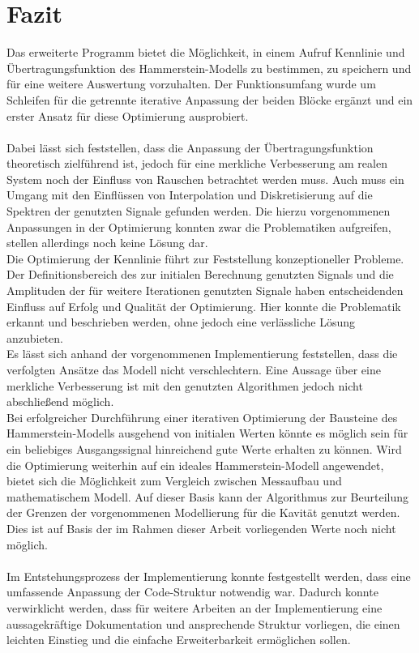 \documentclass[../Report.tex]{subfiles}
\begin{document}
\chapter{Fazit}
\label{chap:fazit}
Das erweiterte Programm bietet die Möglichkeit, in einem Aufruf Kennlinie und Übertragungsfunktion des Hammerstein-Modells zu bestimmen, zu speichern und für eine weitere Auswertung vorzuhalten.
Der Funktionsumfang wurde um Schleifen für die getrennte iterative Anpassung der beiden Blöcke ergänzt und ein erster Ansatz für diese Optimierung ausprobiert.
\\
\\ 
Dabei lässt sich feststellen, dass die Anpassung der Übertragungsfunktion theoretisch zielführend ist, jedoch für eine merkliche Verbesserung am realen System noch der Einfluss von Rauschen betrachtet werden muss. Auch muss ein Umgang mit den Einflüssen von Interpolation und Diskretisierung auf die Spektren der genutzten Signale gefunden werden. Die hierzu vorgenommenen Anpassungen in der Optimierung konnten zwar die Problematiken aufgreifen, stellen allerdings noch keine Lösung dar.
\\
Die Optimierung der Kennlinie führt zur Feststellung konzeptioneller Probleme. Der Definitionsbereich des zur initialen Berechnung genutzten Signals und die Amplituden der für weitere Iterationen genutzten Signale haben entscheidenden Einfluss auf Erfolg und Qualität der Optimierung. Hier konnte die Problematik erkannt und beschrieben werden, ohne jedoch eine verlässliche Lösung anzubieten. 
\\
Es lässt sich anhand der vorgenommenen Implementierung feststellen, dass die verfolgten Ansätze das Modell nicht verschlechtern. Eine Aussage über eine merkliche Verbesserung ist mit den genutzten Algorithmen jedoch nicht abschließend möglich. 
\\
Bei erfolgreicher Durchführung einer iterativen Optimierung der Bausteine des Hammerstein-Modells ausgehend von initialen Werten könnte es möglich sein für ein beliebiges Ausgangssignal hinreichend gute Werte erhalten zu können. Wird die Optimierung weiterhin auf ein ideales Hammerstein-Modell angewendet, bietet sich die Möglichkeit zum Vergleich zwischen Messaufbau und mathematischem Modell. Auf dieser Basis kann der Algorithmus zur Beurteilung der Grenzen der vorgenommenen Modellierung für die Kavität genutzt werden.
Dies ist auf Basis der im Rahmen dieser Arbeit vorliegenden Werte noch nicht möglich. 
\\
\\
Im Entstehungsprozess der Implementierung konnte festgestellt werden, dass eine umfassende Anpassung der Code-Struktur notwendig war. Dadurch konnte verwirklicht werden, dass für weitere Arbeiten an der Implementierung eine aussagekräftige Dokumentation und ansprechende Struktur vorliegen, die einen leichten Einstieg und die einfache Erweiterbarkeit ermöglichen sollen.
\end{document}
